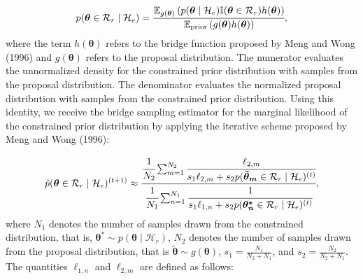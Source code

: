 \documentclass[
  english,
  man,floatsintext]{apa6}
\begin{document}
\begin{align}
    p(\boldsymbol{\theta} \in \mathcal{R}_r \mid \mathcal{H}_e) = \cfrac{\mathbb{E}_{g(\boldsymbol{\theta})}\left(p(\boldsymbol{\theta}\mid \mathcal{H}_e) \mathbb{I}(\boldsymbol{\theta}\in\mathcal{R}_r)h(\boldsymbol{\theta})\right)}{\mathbb{E}_{\text{prior}} \left(g(\boldsymbol{\theta})h(\boldsymbol{\theta})\right)},
    \label{Eq:bridgeidentity}
\end{align}
where the term \(h(\boldsymbol{\theta})\) refers to the bridge function proposed by Meng and Wong (1996) and \(g(\boldsymbol{\theta})\) refers to the proposal distribution. The numerator evaluates the unnormalized density for the constrained prior distribution with samples from the proposal distribution. The denominator evaluates the normalized proposal distribution with samples from the constrained prior distribution. Using this identity, we receive the bridge sampling estimator for the marginal likelihood of the constrained prior distribution by applying the iterative scheme proposed by Meng and Wong (1996):

\begin{align*}
    \hat p(\boldsymbol{\theta} \in \mathcal{R}_r \mid \mathcal{H}_e)^{(t+1)} \approx \cfrac{\cfrac{1}{N_2} \sum_{m = 1}^{N_2} \cfrac{\ell_{2,m}}{s_1 \ell_{2,m} + s_2 p(\boldsymbol{\tilde \theta_m} \in \mathcal{R}_r \mid \mathcal{H}_e)^{(t)}}}
    {\cfrac{1}{N_1} \sum_{n = 1}^{N_1} \cfrac{1}{s_1 \ell_{1,n} + s_2 p(\boldsymbol{\theta^*_n} \in \mathcal{R}_r \mid \mathcal{H}_e)^{(t)}}},
\end{align*}
where \(N_1\) denotes the number of samples drawn from the constrained distribution, that is, \(\boldsymbol{\theta}^* \sim p(\boldsymbol{\theta} \mid \mathcal{H}_r)\), \(N_2\) denotes the number of samples drawn from the proposal distribution, that is \(\boldsymbol{\tilde \theta} \sim g(\boldsymbol{\theta})\),
\(s_1 = \frac{N_1}{N_2 + N_1}\), and \(s_2 = \frac{N_2}{N_2 + N_1}\). The quantities \(\ell_{1,n}\) and \(\ell_{2,m}\) are defined as follows:
\end{document}
